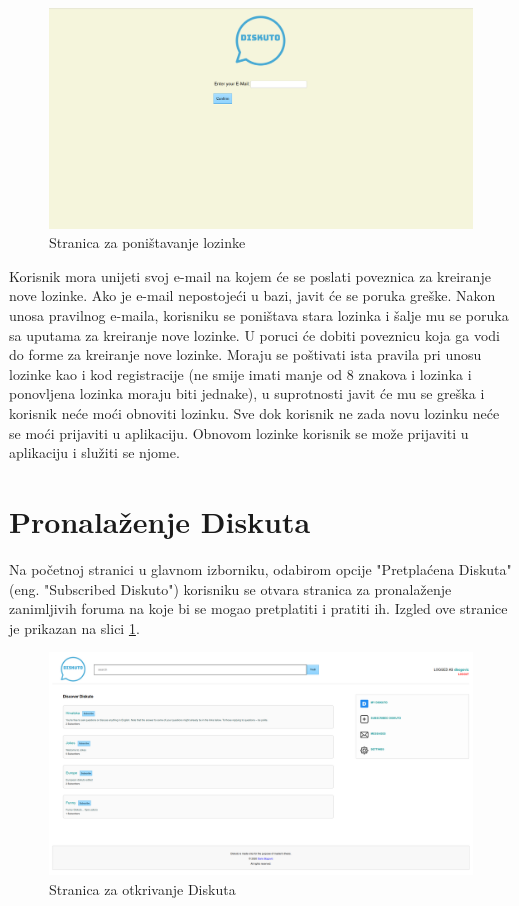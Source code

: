 \documentclass{foi}
\begin{document}
\begin{figure}[h!]
    \centering
    \includegraphics[width=1\textwidth]{slike/zaboravljena-lozinka.png}
    \caption{Stranica za poništavanje lozinke}
\end{figure}

Korisnik mora unijeti svoj e-mail na kojem će se poslati poveznica za kreiranje nove lozinke. Ako je e-mail nepostojeći u bazi, javit će se poruka greške. Nakon unosa pravilnog e-maila, korisniku se poništava stara lozinka i šalje mu se poruka sa uputama za kreiranje nove lozinke. U poruci će dobiti poveznicu koja ga vodi do forme za kreiranje nove lozinke. Moraju se poštivati ista pravila pri unosu lozinke kao i kod registracije (ne smije imati manje od 8 znakova i lozinka i ponovljena lozinka moraju biti jednake), u suprotnosti javit će mu se greška i korisnik neće moći obnoviti lozinku. Sve dok korisnik ne zada novu lozinku neće se moći prijaviti u aplikaciju. Obnovom lozinke korisnik se može prijaviti u aplikaciju i služiti se njome.

\section{Pronalaženje Diskuta}

Na početnoj stranici u glavnom izborniku, odabirom opcije "Pretplaćena Diskuta" (eng. "Subscribed Diskuto") korisniku se otvara stranica za pronalaženje zanimljivih foruma na koje bi se mogao pretplatiti i pratiti ih. Izgled ove stranice je prikazan na slici \ref{otkrij}.

\begin{figure}[h!]
    \centering
    \includegraphics[width=1\textwidth]{slike/otkrij.png}
    \caption{Stranica za otkrivanje Diskuta}
    \label{otkrij}
\end{figure}
\end{document}
